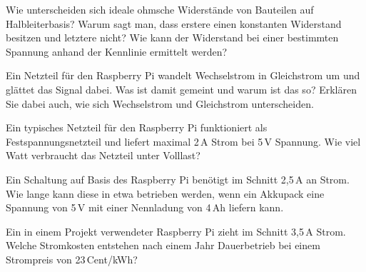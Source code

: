 \bigskip
\teilaufgabe
Wie unterscheiden sich ideale ohmsche Widerstände von Bauteilen auf Halbleiterbasis?
Warum sagt man, dass erstere einen konstanten Widerstand besitzen und letztere nicht?
Wie kann der Widerstand bei einer bestimmten Spannung anhand der Kennlinie ermittelt
werden?

\teilaufgabe
Ein Netzteil für den Raspberry Pi wandelt Wechselstrom in Gleichstrom um und
glättet das Signal dabei. Was ist damit gemeint und warum ist das so? Erklären
Sie dabei auch, wie sich Wechselstrom und Gleichstrom unterscheiden.

\bigskip
\teilaufgabe
Ein typisches Netzteil für den Raspberry Pi funktioniert als Festspannungsnetzteil
und liefert maximal 2\,A Strom bei 5\,V Spannung. Wie viel Watt verbraucht das Netzteil
unter Volllast?

\bigskip
\teilaufgabe
Ein Schaltung auf Basis des Raspberry Pi benötigt im Schnitt 2,5\,A an Strom.
Wie lange kann diese in etwa betrieben werden, wenn ein Akkupack eine Spannung
von 5\,V mit einer Nennladung von 4\,Ah liefern kann.

\bigskip
\teilaufgabe
Ein in einem Projekt verwendeter Raspberry Pi zieht im Schnitt 3,5\,A Strom.
Welche Stromkosten entstehen nach einem Jahr Dauerbetrieb bei einem Strompreis
von 23\,Cent/kWh?



